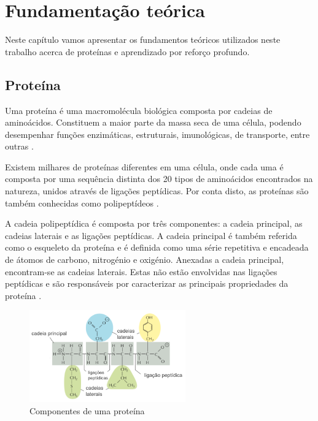 

\chapter{Fundamentação teórica}

Neste capítulo vamos apresentar os fundamentos teóricos utilizados neste trabalho acerca de proteínas e aprendizado por reforço profundo. 


\section{Proteína}
Uma proteína é uma macromolécula biológica composta por cadeias de aminoácidos. 
Constituem a maior parte da massa seca de uma célula, podendo desempenhar funções enzimáticas, estruturais,
imunológicas, de transporte, entre outras \cite{Bio}. 

Existem milhares de proteínas diferentes em uma célula,
onde cada uma é composta por uma sequência distinta dos 20 tipos de aminoácidos encontrados na natureza,
unidos através de ligações peptídicas.
Por conta disto, as proteínas são também conhecidas como polipeptídeos \cite{Bio}. 

A cadeia polipeptídica é composta por três componentes: a cadeia principal,
as cadeias laterais e as ligações peptídicas.
A cadeia principal é também referida como o esqueleto da proteína e
é definida como uma série repetitiva e encadeada de átomos de carbono,
nitrogénio e oxigénio. Anexadas a cadeia principal, encontram-se as cadeias laterais. 
Estas não estão envolvidas nas ligações peptídicas e são responsáveis por caracterizar as principais propriedades da proteína \cite{Bio}. 

\begin{figure}[H]
     \centering
     \includegraphics[width=0.6\textwidth]{figuras/ProteinBackbone.png}
     \caption{Componentes de uma proteína}
\end{figure}

